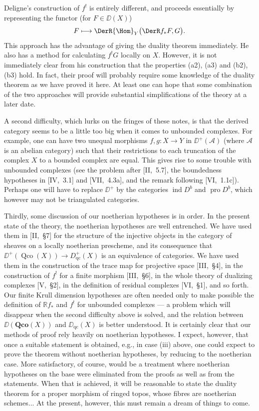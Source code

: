 Deligne's construction of $f^{!}$ is entirely different, and proceeds essentially by representing the functor (for $F\in \DD(X)$)
\[
F\longmapsto \DerR{\Hom}_{Y}\bigl(\DerR f_{*}F,G\bigr).
\]
This approach has the advantage of giving the duality theorem immediately. He also has a method for calculating $f^{!}G$ locally on $X$. However, it is not immediately clear from his construction that the properties (a2), (a3) and (b2), (b3) hold. In fact, their proof will probably require some knowledge of the duality theorem as we have proved it here. At least one can hope that some combination of the two approaches will provide substantial simplifications of the theory at a later date.

A second difficulty, which lurks on the fringes of these notes, is that the derived category seems to be a little too big when it comes to unbounded complexes. For example, one can have two unequal morphisms $f,g\colon X\to Y$ in $\DD^{+}(\mathcal{A})$ (where $\mathcal{A}$ is an abelian category) such that their restrictions to each truncation of the complex $X$ to a bounded complex are equal. This gives rise to some trouble with unbounded complexes (see the problem after [II,~5.7], the boundedness hypotheses in [IV,~3.1] and [VII,~4.3a], and the remark following [VI,~1.1c]). Perhaps one will have to replace $\DD^{+}$ by the categories $\operatorname{ind}D^{b}$ and $\operatorname{pro}D^{b}$, which however may not be triangulated categories.

Thirdly, some discussion of our noetherian hypotheses is in order. In the present state of the theory, the noetherian hypotheses are well entrenched. We have used them in [II,~\S7] for the structure of the injective objects in the category of sheaves on a locally noetherian prescheme, and its consequence that $\DD^{+}(\operatorname{Qco}(X))\to D_{\operatorname{qc}}^{+}(X)$ is an equivalence of categories. We have used them in the construction of the trace map for projective space [III,~\S4], in the construction of $f^{!}$ for a finite morphism [III,~\S6], in the whole theory of dualizing complexes [V,~\S2], in the definition of residual complexes [VI,~\S1], and so forth. Our finite Krull dimension hypotheses are often needed only to make possible the definition of $\mathbb{R}f_{*}$ and $f^{!}$ for unbounded complexes — a problem which will disappear when the second difficulty above is solved, and the relation between $\DD(\mathbf{Qco}(X))$ and $\DD_{\mathrm{qc}}(X)$ is better understood. It is certainly clear that our methods of proof rely heavily on noetherian hypotheses. I expect, however, that once a suitable statement is obtained, e.g., in case (iii) above, one could expect to prove the theorem without noetherian hypotheses, by reducing to the noetherian case. More satisfactory, of course, would be a treatment where noetherian hypotheses on the base were eliminated from the proofs as well as from the statements. When that is achieved, it will be reasonable to state the duality theorem for a proper morphism of ringed topos, whose fibres are noetherian schemes... At the present, however, this must remain a dream of things to come.

